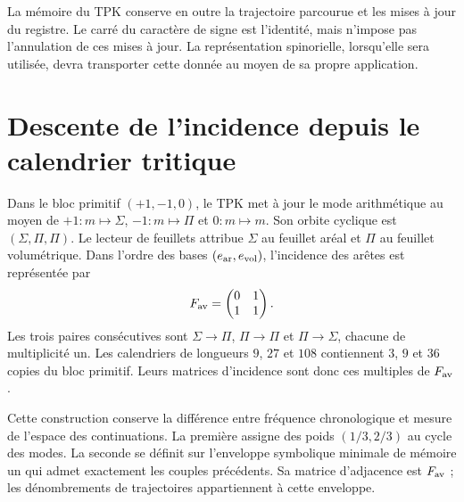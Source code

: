 La mémoire du TPK conserve en outre la trajectoire parcourue et les mises à jour du registre. Le carré du caractère de signe est l'identité, mais n'impose pas l'annulation de ces mises à jour. La représentation spinorielle, lorsqu'elle sera utilisée, devra transporter cette donnée au moyen de sa propre application.

\section{Descente de l’incidence depuis le calendrier tritique}

Dans le bloc primitif $(+1,-1,0)$, le TPK met à jour le mode arithmétique au moyen de
$+1:m\mapsto\Sigma$, $-1:m\mapsto\Pi$ et $0:m\mapsto m$. Son orbite cyclique
est $(\Sigma,\Pi,\Pi)$. Le lecteur de feuillets attribue $\Sigma$ au feuillet aréal et
$\Pi$ au feuillet volumétrique. Dans l’ordre des bases $(e_{\rm ar},e_{\rm vol})$,
l’incidence des arêtes est représentée par
\begin{equation}
 F_{\rm av}=\begin{pmatrix}0&1\\1&1\end{pmatrix}.
 \label{x_reciprocidad:iii:eq:fav}
\end{equation}
Les trois paires consécutives sont $\Sigma\to\Pi$, $\Pi\to\Pi$ et $\Pi\to\Sigma$, chacune de multiplicité un. Les calendriers de longueurs $9$, $27$ et $108$ contiennent $3$, $9$ et $36$ copies du bloc primitif. Leurs matrices d'incidence sont donc ces multiples de $F_{\rm av}$.

Cette construction conserve la différence entre fréquence chronologique et mesure
de l’espace des continuations. La première assigne des poids $(1/3,2/3)$ au cycle
des modes. La seconde se définit sur l’enveloppe symbolique minimale de mémoire
un qui admet exactement les couples précédents. Sa matrice d’adjacence est
$F_{\rm av}$ ; les dénombrements de trajectoires appartiennent à cette enveloppe.

